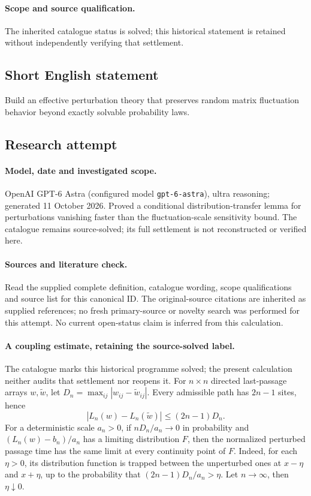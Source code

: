 \documentclass[11pt]{article}
\begin{document}
\paragraph{Scope and source qualification.}The inherited catalogue status is solved; this historical statement is retained without independently verifying that settlement.
\subsection{Short English statement}
Build an effective perturbation theory that preserves random matrix fluctuation behavior beyond exactly solvable probability laws.
\subsection{Research attempt}
\paragraph{Model, date and investigated scope.}
OpenAI GPT-6 Astra (configured model \texttt{gpt-6-astra}), ultra reasoning; generated 11 October 2026. Proved a conditional distribution-transfer lemma for perturbations vanishing faster than the fluctuation-scale sensitivity bound. The catalogue remains source-solved; its full settlement is not reconstructed or verified here.

\paragraph{Sources and literature check.}
Read the supplied complete definition, catalogue wording, scope qualifications and source list for this canonical ID. The original-source citations are inherited as supplied references; no fresh primary-source or novelty search was performed for this attempt. No current open-status claim is inferred from this calculation.

\paragraph{A coupling estimate, retaining the source-solved label.}The catalogue marks this historical programme solved; the present calculation neither audits that settlement nor reopens it. For \(n\times n\) directed last-passage arrays \(w,\widetilde w\), let \(D_n=\max_{ij}|w_{ij}-\widetilde w_{ij}|\). Every admissible path has \(2n-1\) sites, hence
\[|L_n(w)-L_n(\widetilde w)|\le(2n-1)D_n.
\]
For a deterministic scale \(a_n>0\), if \(nD_n/a_n\to0\) in probability and \((L_n(w)-b_n)/a_n\) has a limiting distribution \(F\), then the normalized perturbed passage time has the same limit at every continuity point of \(F\). Indeed, for each \(\eta>0\), its distribution function is trapped between the unperturbed ones at \(x-\eta\) and \(x+\eta\), up to the probability that \((2n-1)D_n/a_n>\eta\). Let \(n\to\infty\), then \(\eta\downarrow0\).
\end{document}
